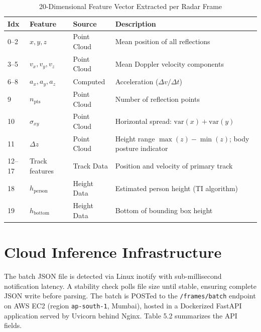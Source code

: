 \begin{table}[H]
\caption{20-Dimensional Feature Vector Extracted per Radar Frame}
\label{tab:summary_4}
\centering
\begin{tabularx}{\textwidth}{@{} l X X X @{}}
\toprule
\textbf{Idx} & \textbf{Feature} & \textbf{Source} & \textbf{Description} \\ \midrule
0--2 & $x, y, z$ & Point Cloud & Mean position of all reflections \\
3--5 & $v_x, v_y, v_z$ & Point Cloud & Mean Doppler velocity components \\
6--8 & $a_x, a_y, a_z$ & Computed & Acceleration ($\Delta v / \Delta t$) \\
9 & $n_{\text{pts}}$ & Point Cloud & Number of reflection points \\
10 & $\sigma_{xy}$ & Point Cloud & Horizontal spread: $\text{var}(x) + \text{var}(y)$ \\
11 & $\Delta z$ & Point Cloud & Height range $\max(z) - \min(z)$; body posture indicator \\
12--17 & Track features & Track Data & Position and velocity of primary track \\
18 & $h_{\text{person}}$ & Height Data & Estimated person height (TI algorithm) \\
19 & $h_{\text{bottom}}$ & Height Data & Bottom of bounding box height \\ \bottomrule
\end{tabularx}
\end{table}




\section{Cloud Inference Infrastructure}

The batch JSON file is detected via Linux inotify with sub-millisecond notification latency. A stability check polls file size until stable, ensuring complete JSON write before parsing. The batch is POSTed to the \texttt{/frames/batch} endpoint on AWS EC2 (region \texttt{ap-south-1}, Mumbai), hosted in a Dockerized FastAPI application served by Uvicorn behind Nginx. Table 5.2 summarizes the API fields.

